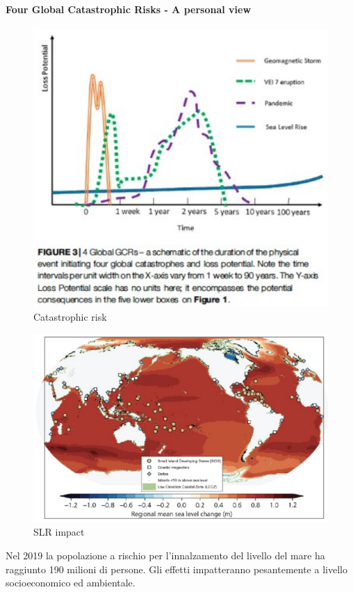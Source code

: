 \paragraph{Four Global Catastrophic Risks - A personal view}
\begin{figure}[htpb]
    \centering
    \includegraphics[width=0.5\linewidth]{uploads/catastrophic risk.png}
    \caption{Catastrophic risk}
\end{figure}
\begin{figure}[htpb]
    \centering
    \includegraphics[width=0.5\linewidth]{uploads/SLR impact.png}
    \caption{SLR impact}
\end{figure}
Nel 2019 la popolazione a rischio per l’innalzamento del livello del mare ha raggiunto 190 milioni di persone. Gli effetti impatteranno pesantemente a livello socioeconomico ed ambientale.